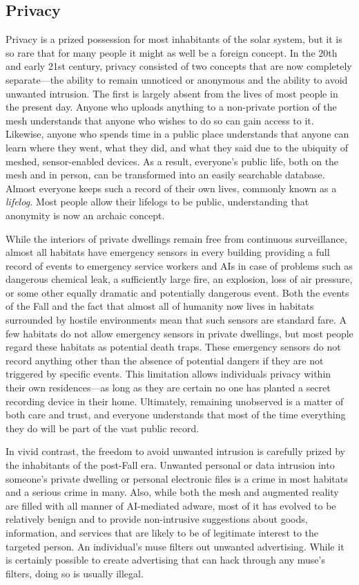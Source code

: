 \subsection{Privacy}

Privacy is a prized possession for most inhabitants of 
the solar system, but it is so rare that for many people 
it might as well be a foreign concept. In the 20th and 
early 21st century, privacy consisted of two concepts 
that are now completely separate—the ability to remain 
unnoticed or anonymous and the ability to avoid unwanted intrusion. The first is largely absent from the 
lives of most people in the present day. Anyone who 
uploads anything to a non-private portion of the mesh 
understands that anyone who wishes to do so can gain 
access to it. Likewise, anyone who spends time in a 
public place understands that anyone can learn where 
they went, what they did, and what they said due to the 
ubiquity of meshed, sensor-enabled devices. As a result, 
everyone's public life, both on the mesh and in person, 
can be transformed into an easily searchable database. 
Almost everyone keeps such a record of their own lives, 
commonly known as a \textit{lifelog.} Most people allow their 
lifelogs to be public, understanding that anonymity is 
now an archaic concept.

While the interiors of private dwellings remain free 
from continuous surveillance, almost all habitats have 
emergency sensors in every building providing a full 
record of events to emergency service workers and AIs 
in case of problems such as dangerous chemical leak, 
a sufficiently large fire, an explosion, loss of air pressure, or some other equally dramatic and potentially 
dangerous event. Both the events of the Fall and the 
fact that almost all of humanity now lives in habitats 
surrounded by hostile environments mean that such 
sensors are standard fare. A few habitats do not allow 
emergency sensors in private dwellings, but most 
people regard these habitats as potential death traps. 
These emergency sensors do not record anything other 
than the absence of potential dangers if they are not 
triggered by specific events. This limitation allows 
individuals privacy within their own residences—as 
long as they are certain no one has planted a secret 
recording device in their home. Ultimately, remaining 
unobserved is a matter of both care and trust, and everyone understands that most of the time everything 
they do will be part of the vast public record.

In vivid contrast, the freedom to avoid unwanted 
intrusion is carefully prized by the inhabitants of the 
post-Fall era. Unwanted personal or data intrusion 
into someone's private dwelling or personal electronic 
files is a crime in most habitats and a serious crime in 
many. Also, while both the mesh and augmented reality are filled with all manner of AI-mediated adware, 
most of it has evolved to be relatively benign and to 
provide non-intrusive suggestions about goods, information, and services that are likely to be of legitimate 
interest to the targeted person. An individual's muse 
filters out unwanted advertising. While it is certainly 
possible to create advertising that can hack through 
any muse's filters, doing so is usually illegal.

